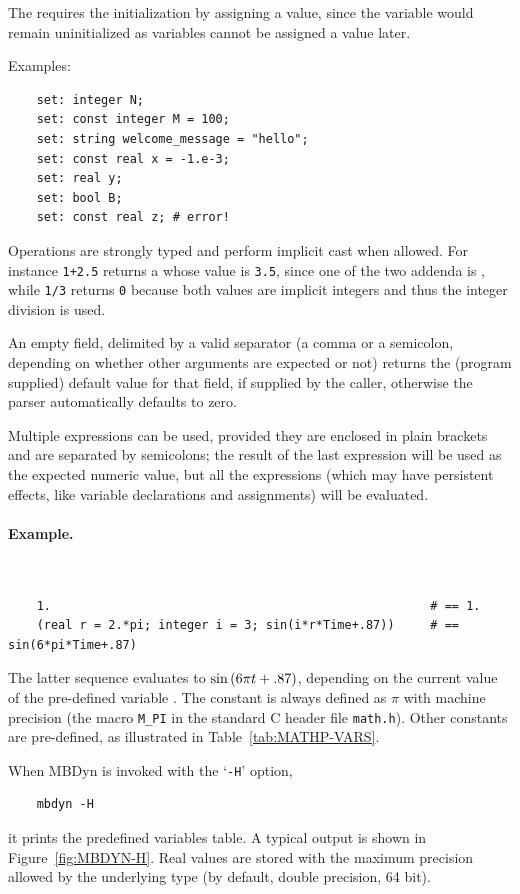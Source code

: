 The   requires the initialization by assigning a value,
since the variable would remain uninitialized as  variables cannot be assigned
a value later.

Examples:
\begin{verbatim}
    set: integer N;
    set: const integer M = 100;
    set: string welcome_message = "hello";
    set: const real x = -1.e-3;
    set: real y;
    set: bool B;
    set: const real z; # error!
\end{verbatim}

Operations are strongly typed and perform implicit cast when allowed.
For instance \texttt{1+2.5} returns a  whose value 
is \texttt{3.5}, since one of the 
two addenda is , while \texttt{1/3} returns \texttt{0} because 
both values are implicit integers and thus the integer division is used.

An empty field, delimited by a valid separator (a comma or a semicolon,
depending on whether other arguments are expected or not) returns the
(program supplied) default value for that field, if supplied by the caller, 
otherwise the parser automatically defaults to zero.

Multiple expressions can be used, provided they are enclosed in plain 
brackets and are separated by semicolons; the result 
of the last expression will be used as the expected numeric value,
but all the expressions (which may have persistent effects, 
like variable declarations and assignments) will be evaluated.

\paragraph{Example.} \
\begin{verbatim}
    1.                                                     # == 1.
    (real r = 2.*pi; integer i = 3; sin(i*r*Time+.87))     # == sin(6*pi*Time+.87)
\end{verbatim}
The latter sequence evaluates to $ \sin\left( 6\pi{t}+.87 \right) $,
depending on the current value of the pre-defined variable .
The constant \kw{pi} is always defined as $ \pi $ with machine precision
(the macro \texttt{M\_PI} in the standard C header file \texttt{math.h}).
Other constants are pre-defined, as illustrated
in Table~\ref{tab:MATHP-VARS}.

When MBDyn is invoked with the `\texttt{-H}' option,
\begin{verbatim}
    mbdyn -H
\end{verbatim}
it prints the predefined variables table.
A typical output is shown in Figure~\ref{fig:MBDYN-H}.
Real values are stored with the maximum precision allowed by the underlying
\kw{real} type (by default, double precision, 64 bit).

